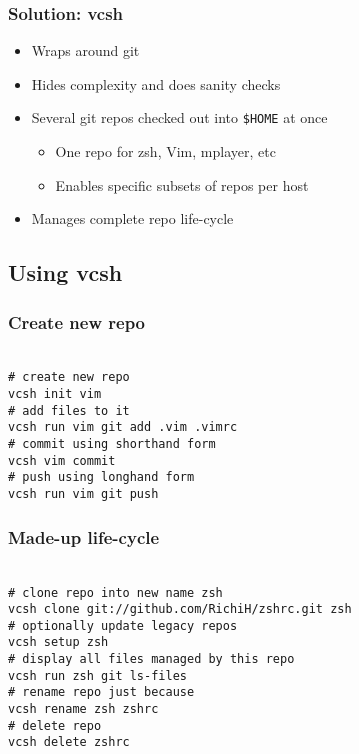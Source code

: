 \documentclass[t]{beamer}
\begin{document}
\begin{frame}
	\frametitle{Solution: vcsh}
	\begin{itemize}
		\item Wraps around git
		\item Hides complexity and does sanity checks
			\item Several git repos checked out into \texttt{\$HOME} at once
		\begin{itemize}
			\item One repo for zsh, Vim, mplayer, etc
			\item Enables specific subsets of repos per host
		\end{itemize}
		\item Manages complete repo life-cycle
	\end{itemize}
\end{frame}

\subsection{Using vcsh}

\begin{frame}
	\frametitle{Create new repo}
	\texttt{ \\
		\# create new repo \\
		vcsh init vim \\
		\# add files to it \\
		vcsh run vim git add .vim .vimrc \\
		\# commit using shorthand form \\
		vcsh vim commit \\
		\# push using longhand form \\
		vcsh run vim git push
	}
\end{frame}

\begin{frame}
	\frametitle{Made-up life-cycle}
	\texttt{ \\
		\# clone repo into new name zsh \\
		vcsh clone git://github.com/RichiH/zshrc.git zsh \\
		\# optionally update legacy repos \\
		vcsh setup zsh \\
		\# display all files managed by this repo \\
		vcsh run zsh git ls-files \\
		\# rename repo just because \\
		vcsh rename zsh zshrc \\
		\# delete repo \\
		vcsh delete zshrc
	}
\end{frame}
\end{document}
